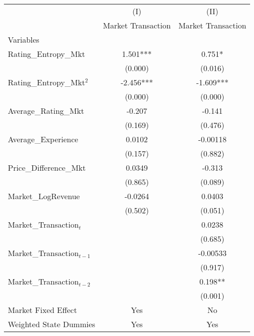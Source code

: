 \begin{table}[H]
\centering
\begin{threeparttable}[t]
\begin{tabular}{@{}lcc@{}}
\toprule
                         & (I)            & (II)           \\
                         & Market Transaction       & Market Transaction       \\
Variables                &   &   \\ \midrule
Rating\_Entropy\_Mkt     & 1.501***       & 0.751*         \\
                         & (0.000)        & (0.016)        \\
Rating\_Entropy\_Mkt$^2$ & -2.456***      & -1.609***      \\
                         & (0.000)        & (0.000)        \\
Average\_Rating\_Mkt     & -0.207         & -0.141         \\
                         & (0.169)        & (0.476)        \\
Average\_Experience      & 0.0102         & -0.00118       \\
                         & (0.157)        & (0.882)        \\
Price\_Difference\_Mkt   & 0.0349         & -0.313         \\
                         & (0.865)        & (0.089)        \\
Market\_LogRevenue       & -0.0264        & 0.0403         \\
                         & (0.502)        & (0.051)        \\
Market\_Transaction$_{t}$&                & 0.0238         \\
                         &                & (0.685)        \\
Market\_Transaction$_{t-1}$    &                & -0.00533       \\
                         &                & (0.917)        \\
Market\_Transaction$_{t-2}$   &                & 0.198**        \\
                         &                & (0.001)        \\
Market Fixed Effect      & Yes            & No             \\
Weighted State Dummies   & Yes            & Yes            \\

\end{tabular}
\end{threeparttable}
\end{table}
